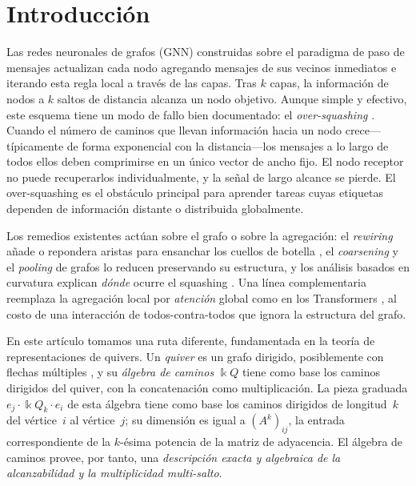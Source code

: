 \documentclass[runningheads]{llncs}
\newcommand{\kk}{\Bbbk}                 %
\newcommand{\kQ}{\kk Q}                 %
\newcommand{\Adj}{A}                    %
\begin{document}
\section{Introducci\'on}

Las redes neuronales de grafos (GNN) construidas sobre el paradigma de paso de
mensajes \cite{gilmer2017neural} actualizan cada nodo agregando mensajes de sus
vecinos inmediatos e iterando esta regla local a trav\'es de las capas. Tras $k$
capas, la informaci\'on de nodos a $k$ saltos de distancia alcanza un nodo
objetivo. Aunque simple y efectivo, este esquema tiene un modo de fallo bien
documentado: el \emph{over-squashing} \cite{alon2021bottleneck}. Cuando el n\'umero
de caminos que llevan informaci\'on hacia un nodo crece---t\'ipicamente de forma
exponencial con la distancia---los mensajes a lo largo de todos ellos deben
comprimirse en un \'unico vector de ancho fijo. El nodo receptor no puede recuperarlos
individualmente, y la se\~nal de largo alcance se pierde. El over-squashing es el obst\'aculo
principal para aprender tareas cuyas etiquetas dependen de informaci\'on distante o
distribuida globalmente.

Los remedios existentes act\'uan sobre el grafo o sobre la agregaci\'on: el
\emph{rewiring} a\~nade o repondera aristas para ensanchar los cuellos de botella
\cite{topping2022understanding}, el \emph{coarsening} y el \emph{pooling} de grafos
lo reducen preservando su estructura, y los an\'alisis basados en
curvatura explican \emph{d\'onde} ocurre el squashing \cite{digiovanni2023oversquashing}.
Una l\'inea complementaria reemplaza la agregaci\'on local por
\emph{atenci\'on} global como en los Transformers \cite{vaswani2017attention}, al
costo de una interacci\'on de todos-contra-todos que ignora la estructura del
grafo.

En este art\'iculo tomamos una ruta diferente, fundamentada en la teor\'ia de
representaciones de quivers. Un \emph{quiver} es un grafo dirigido, posiblemente
con flechas m\'ultiples \cite{schiffler2014quiver,assem2006elements}, y su
\emph{\'algebra de caminos} $\kQ$ tiene como base los caminos dirigidos del quiver,
con la concatenaci\'on como multiplicaci\'on. La pieza graduada
$e_j \cdot \kQ_k \cdot e_i$ de esta \'algebra tiene como base los caminos dirigidos
de longitud~$k$ del v\'ertice~$i$ al v\'ertice~$j$; su dimensi\'on es igual a
$(\Adj^k)_{ij}$, la entrada correspondiente de la $k$-\'esima potencia de la matriz
de adyacencia. El \'algebra de caminos provee, por tanto, una \emph{descripci\'on
exacta y algebraica de la alcanzabilidad y la multiplicidad multi-salto}.
\end{document}
